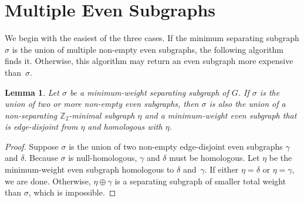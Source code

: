 \documentclass[twoside,leqno,twocolumn]{article}
\def\Z{\mathbb{Z}}
\newtheorem{lemma}[theorem]{Lemma}
\begin{document}
\section{Multiple Even Subgraphs}

We begin with the easiest of the three cases.  If the minimum separating subgraph
$\sigma$ is the union of multiple non-empty even subgraphs, the following algorithm finds it.  Otherwise, this algorithm may return an even subgraph more expensive
than~$\sigma$.

\begin{lemma}
\label{L:minimum-cycle}
Let $\sigma$ be a minimum-weight separating subgraph of $G$.  If $\sigma$ is the union of two or more non-empty even subgraphs, then $\sigma$ is also the union of a non-separating $\Z_2$-minimal subgraph $\eta$ and a minimum-weight even subgraph that is edge-disjoint from $\eta$ and homologous with $\eta$.
\end{lemma}




\begin{proof}
Suppose $\sigma$ is the union of two non-empty edge-disjoint even subgraphs $\gamma$ and $\delta$.  Because $\sigma$ is null-homologous, $\gamma$ and $\delta$ must be homologous.  Let $\eta$ be the minimum-weight even subgraph homologous to $\delta$ and~$\gamma$.  If either $\eta = \delta$ or $\eta = \gamma$, we are done.  Otherwise, $\eta\oplus\gamma$ is a separating subgraph of smaller total weight than $\sigma$, which is impossible.
\end{proof}
\end{document}
